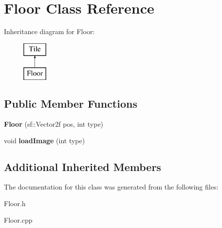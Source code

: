 \hypertarget{class_floor}{}\section{Floor Class Reference}
\label{class_floor}
Inheritance diagram for Floor\+:\begin{figure}[H]
\begin{center}
\leavevmode
\includegraphics[height=2.000000cm]{class_floor}
\end{center}
\end{figure}
\subsection*{Public Member Functions}
\begin{DoxyCompactItemize}
\item 
\mbox{\label{class_floor_a2a2c2380294e13ca8d9ba0b133ad4d80}} 
{\bfseries Floor} (sf\+::\+Vector2f pos, int type)
\item 
\mbox{\label{class_floor_acbd296ad6187a5f1cbff67a58b525054}} 
void {\bfseries load\+Image} (int type)
\end{DoxyCompactItemize}
\subsection*{Additional Inherited Members}


The documentation for this class was generated from the following files\+:\begin{DoxyCompactItemize}
\item 
Floor.\+h\item 
Floor.\+cpp\end{DoxyCompactItemize}
